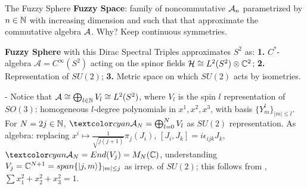 \begin{frame}{The Fuzzy Sphere} %
    \textbf{Fuzzy Space}: %
    family of noncommutative $\mathcal A_n$ parametrized by $n \in \mathbb N$ with increasing dimension and such that that approximate the commutative algebra $\mathcal A$. Why? Keep continuous symmetries.
    
    \textbf{Fuzzy Sphere} with this Dirac Spectral Triples  \cite{DAndrea2013} approximates $S^2$ as: \textbf{1.} $C^*$-algebra $\mathcal A = C^\infty(S^2)$ acting on the spinor fields $\mathcal H \cong L^2(S^2)\otimes \mathbb C^2$; \textbf{2.} Representation of $SU(2)$; \textbf{3.}  Metric space on which $SU(2)$ acts by isometries.
    
    - Notice that $\mathcal A \cong \bigoplus_{l \in \mathbb N} V_l \cong L^2(S^2)$, where $V_l$ is the spin $l$ representation of $SO(3)$: homogeneous $l$-degree polynomials in $x^1, x^2, x^3$, with basis $\{Y^l_m\}_{|m| \leq l}$. 
    For $N = 2j \in \mathbb N$, 
    $\lbtext{\acal_N}= \bigoplus_{l = 0}^N V_l$ as $SU(2)$ representation. 
    As algebra: replacing $x^i \mapsto \frac{1}{\sqrt{j(j+1)}} \pi_{j}(J_i)$, $[J_i, J_k] = i \epsilon_{ijk} J_k$, $\lbtext{\acal_N} = End(V_j) = M_{N}(\CC)$, understanding $V_j= \mathbb C^{N+1} = span\{|j, m\rangle\}_{|m| \leq j}$ as irrep. of $SU(2)$; this follows from  \then {}, $\sum x_1^2 + x_2^2 + x_3^2 = 1$.
    
    
    
    
\end{frame}